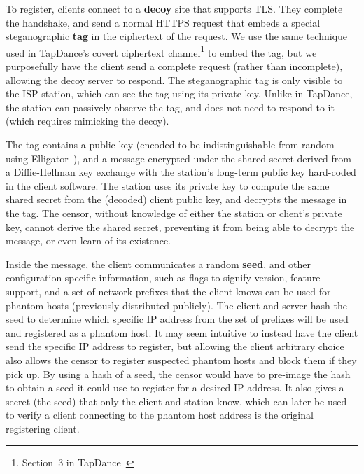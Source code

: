 \documentclass[sigconf]{acmart}
\begin{document}
\medskip

To register, clients connect to a \textbf{decoy} site that supports TLS. They
complete the handshake, and send a normal HTTPS request that embeds a special
steganographic \textbf{tag} in the ciphertext of the request. We use
the same technique used in TapDance's covert ciphertext
channel\footnote{Section~3 in
TapDance~\cite{tapdance14}} to embed the tag, but we purposefully have the client
send a complete request (rather than incomplete), allowing the decoy server to respond.
The steganographic tag is only visible to the ISP station, which can see the tag using its
private key. Unlike in TapDance, the \scheme station can passively observe
the tag, and does not need to respond to it (which requires mimicking the
decoy).


The tag contains a public key (encoded to be indistinguishable from random using
Elligator~\cite{elligator}), and a message encrypted under the shared secret
derived from a Diffie-Hellman key exchange with the station's long-term public key hard-coded
in the client software. The station uses its private key to compute the same
shared secret from the (decoded) client public key, and decrypts the message in the
tag. The censor, without knowledge of either the station or client's private
key, cannot derive the shared secret, preventing it from being able to decrypt
the message, or even learn of its existence.


Inside the message, the client communicates a random \textbf{seed}, and other
configuration-specific information, such as flags to signify version, feature
support, and a set of network prefixes that the client knows can be used
for phantom hosts (previously distributed publicly).
The client and server hash the seed to determine which specific
IP address from the set of prefixes will be used and registered as a phantom host.
It may seem intuitive to instead have the client
send the specific IP address to register, but allowing the client arbitrary
choice also allows the censor to register suspected phantom hosts and block them if
they pick up.
By using a hash of a seed, the censor would have to pre-image the hash to
obtain a seed it could use to register for a desired IP address.
It also gives a
secret (the seed) that only the client and station know, which can
later be used to verify a client connecting to the phantom host address is the
original registering client.
\end{document}
